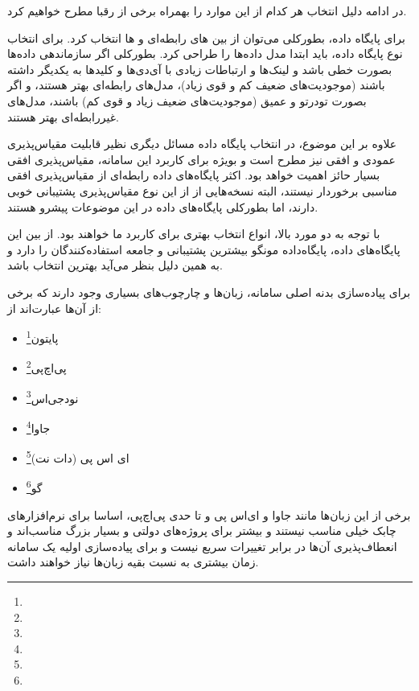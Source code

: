 در ادامه دلیل انتخاب هر کدام از این موارد را بهمراه برخی از رقبا مطرح خواهیم کرد.


برای پایگاه داده، بطورکلی می‌توان از بین های رابطه‌ای و ها انتخاب کرد. برای انتخاب نوع پایگاه داده، باید ابتدا مدل داده‌ها را طراحی کرد. بطورکلی اگر سازماندهی داده‌ها بصورت خطی باشد و لینک‌ها و ارتباطات زیادی با آی‌دی‌ها و کلیدها به یکدیگر داشته باشند (موجودیت‌های ضعیف کم و قوی زیاد)، مدل‌های رابطه‌ای بهتر هستند، و اگر بصورت تودرتو و عمیق (موجودیت‌های ضعیف زیاد و قوی کم) باشند، مدل‌های غیررابطه‌ای بهتر هستند.

علاوه بر این موضوع، در انتخاب پایگاه داده مسائل دیگری نظیر قابلیت مقیاس‌پذیری عمودی و افقی نیز مطرح است و بویژه برای کاربرد این سامانه، مقیاس‌پذیری افقی بسیار حائز اهمیت خواهد بود. اکثر پایگاه‌های داده رابطه‌ای از مقیاس‌پذیری افقی مناسبی برخوردار نیستند، البته نسخه‌هایی از  از این نوع مقیاس‌پذیری پشتیبانی خوبی دارند، اما بطورکلی پایگاه‌های داده  در این موضوعات پیشرو هستند.

با توجه به دو مورد بالا، انواع  انتخاب بهتری برای کاربرد ما خواهند بود. از بین این پایگاه‌های داده، پایگاه‌داده مونگو بیشترین پشتیبانی و جامعه استفاده‌کنندگان را دارد و به همین دلیل بنظر می‌آید بهترین انتخاب باشد.


برای پیاده‌سازی بدنه اصلی سامانه، زبان‌ها و چارچوب‌های بسیاری وجود دارند که برخی از آن‌ها عبارت‌اند از:
\begin{itemize}
	\item پایتون\footnote{}
	\item پی‌اچ‌پی\footnote{}
	\item نودجی‌اس\footnote{}
	\item جاوا\footnote{}
	\item ای اس پی (دات نت)\footnote{}
	\item گو\footnote{}
\end{itemize}

برخی از این زبان‌ها مانند جاوا و ای‌اس پی و تا حدی پی‌اچ‌پی، اساسا برای نرم‌افزارهای چابک خیلی مناسب نیستند و بیشتر برای پروژه‌های دولتی و بسیار بزرگ مناسب‌اند و انعطاف‌پذیری آن‌ها در برابر تغییرات سریع نیست و برای پیاده‌سازی اولیه یک سامانه زمان بیشتری به نسبت بقیه زبان‌ها نیاز خواهند داشت.

